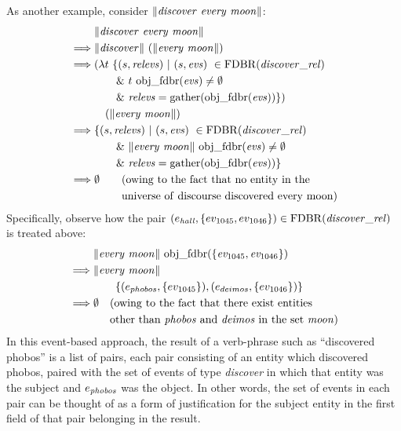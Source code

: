 \documentclass[../main.tex]{subfiles}
\begin{document}
\begin{refsection}
As another example, consider $\lVert \mathit{\mathit{discover}\ \mathit{every}\ \mathit{moon}} \rVert$:
\begin{equation*}
	\begin{split}
		& \meaningof{\discover\ \every\ \moon} \\
		\implies & \meaningof{discover}\ (\meaningof{\every\ \moon}) \\
		\implies & (\lambda t\ \{(s, \mathit{relevs})\ |\ (s, \mathit{evs})\ \in \FDBR{\relation{\discover}}\ \\
		& \qquad \&\ t\ \objfdbr{evs} \neq \emptyset  \\
		& \qquad \&\ \mathit{relevs} = \gatherevs{\objfdbr{evs}}\})\ \\
		& \quad (\meaningof{\every\ \moon}) \\
		\implies & \{(s, \mathit{relevs})\ |\ (s, \mathit{evs})\ \in \FDBR{\relation{\discover}}\ \\
		& \qquad \&\ \meaningof{\every\ \moon}\ \objfdbr{evs} \neq \emptyset \\
		& \qquad \&\ \mathit{relevs} = \gatherevs{\objfdbr{evs}} \} \\
		\implies & \emptyset \qquad(\mathrm{owing\ to\ the\ fact\ that\ no\ entity\ in\ the} \\
		\phantom{\implies} & \phantom{\emptyset} \qquad \mathrm{universe\ of\ discourse\ discovered\ every\ moon})
	\end{split}
\end{equation*}
Specifically, observe how the pair $(e_{\mathit{hall}}, \{ ev_{\mathrm{1045}}, ev_{\mathrm{1046}} \}) \in \mathrm{FDBR}({\mathit{\mathit{discover}\_rel}})$ is treated above:
\begin{equation*}
	\begin{split}
		&\meaningof{\mathit{every\ moon}}\ \objfdbr{\{\eventassoc{1045}, \eventassoc{1046}\}} \\
		\implies & \meaningof{\mathit{every\ moon}}\ \\
		& \qquad \{(\entityassoc{phobos}, \{\eventassoc{1045}\}), (\entityassoc{deimos}, \{\eventassoc{1046}\})\} \\
		\implies & \emptyset \quad (\mathrm{owing\ to\ the\ fact\ that\ there\ exist\ entities}\ \\
		\phantom{\implies}	& \phantom{\emptyset} \quad \mathrm{other\ than\ \phobos\ and\ \deimos \ in\ the\ set\ \moon})
	\end{split}
\end{equation*}
In this event-based approach, the result of a verb-phrase such as ``discovered phobos'' is a list
of pairs, each pair consisting of an entity which discovered phobos, paired with the set of events of
type {\em discover} in which that entity was the subject and $e_{\mathit{phobos}}$ was the object.
In other words, the set of events in each pair can be thought of as a form of justification for the subject entity in the first field of that pair belonging in the result.


\end{refsection}
\end{document}
